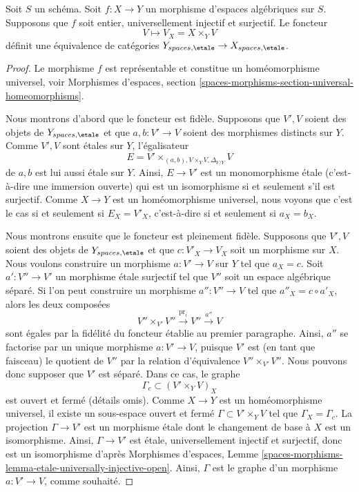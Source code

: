\begin{theorem}
\label{theorem-topological-invariance}
Soit $S$ un schéma.
Soit $f : X \to Y$ un morphisme d'espaces algébriques sur $S$.
Supposons que $f$ soit entier, universellement injectif et surjectif.
Le foncteur
$$
V \longmapsto V_X = X \times_Y V
$$
définit une équivalence de catégories
$Y_{spaces, \etale} \to X_{spaces, \etale}$.
\end{theorem}

\begin{proof}
Le morphisme $f$ est représentable et constitue un homéomorphisme universel, voir
Morphismes d'espaces,
section \ref{spaces-morphisms-section-universal-homeomorphisms}.

\medskip\noindent
Nous montrons d'abord que le foncteur est fidèle.
Supposons que $V', V$ soient des objets de $Y_{spaces, \etale}$ et
que $a, b : V' \to V$ soient des morphismes distincts sur $Y$.
Comme $V', V$ sont étales sur $Y$, l'égalisateur
$$
E =  V' \times_{(a, b), V \times_Y V, \Delta_{V/Y}} V
$$
de $a, b$ est lui aussi étale sur $Y$. Ainsi, $E \to V'$ est un monomorphisme étale
(c'est-à-dire une immersion ouverte) qui est un isomorphisme si et seulement s'il est
surjectif. Comme $X \to Y$ est un homéomorphisme universel, nous voyons que c'est
le cas si et seulement si $E_X = V'_X$, c'est-à-dire si et seulement si $a_X = b_X$.

\medskip\noindent
Nous montrons ensuite que le foncteur est pleinement fidèle.
Supposons que $V', V$ soient des objets de $Y_{spaces, \etale}$ et
que $c : V'_X \to V_X$ soit un morphisme sur $X$. Nous voulons construire
un morphisme $a : V' \to V$ sur $Y$ tel que $a_X = c$.
Soit $a' : V'' \to V'$ un morphisme étale surjectif tel que $V''$ soit
un espace algébrique séparé. Si l'on peut construire un morphisme
$a'' : V'' \to V$ tel que $a''_X = c \circ a'_X$, alors les deux composées
$$
V'' \times_{V'} V'' \xrightarrow{\text{pr}_i} V'' \xrightarrow{a''} V
$$
sont égales par la fidélité du foncteur établie au premier
paragraphe. Ainsi, $a''$ se factorise par un unique morphisme
$a : V' \to V$, puisque $V'$ est (en tant que faisceau) le quotient de $V''$ par
la relation d'équivalence $V'' \times_{V'} V''$. Nous pouvons donc supposer que
$V'$ est séparé. Dans ce cas, le graphe
$$
\Gamma_c \subset (V' \times_Y V)_X
$$
est ouvert et fermé (détails omis). Comme $X \to Y$ est un homéomorphisme
universel, il existe un sous-espace ouvert et fermé
$\Gamma \subset V' \times_Y V$ tel que $\Gamma_X = \Gamma_c$.
La projection $\Gamma \to V'$ est un morphisme étale dont le changement
de base à $X$ est un isomorphisme. Ainsi, $\Gamma \to V'$ est étale,
universellement injectif et surjectif, donc est un isomorphisme d'après
Morphismes d'espaces,
Lemme \ref{spaces-morphisms-lemma-etale-universally-injective-open}.
Ainsi, $\Gamma$ est le graphe d'un morphisme $a : V' \to V$, comme souhaité.


\end{proof}
